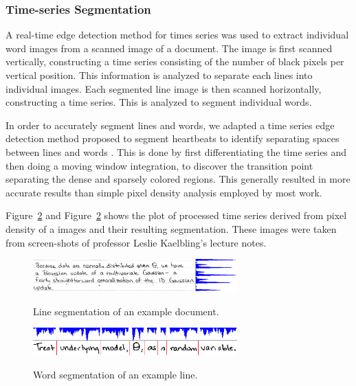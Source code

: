 \documentclass[12pt]{article}
\begin{document}
		\subsubsection{Time-series Segmentation}
		A real-time edge detection method for times series was used to extract individual word images from a scanned image of a document. The image is first scanned vertically, constructing a time series consisting of the number of black pixels per vertical position. This information is analyzed to separate each lines into individual images. Each segmented line image is then scanned horizontally, constructing a time series. This is analyzed to segment individual words.
		
		In order to accurately segment lines and words, we adapted a time series edge detection method proposed to segment heartbeats to identify separating spaces between lines and words \cite{QRS}. This is done by first differentiating the time series and then doing a moving window integration, to discover the transition point separating the dense and sparsely colored regions. This generally resulted in more accurate results than simple pixel density analysis employed by most work.
		
		Figure~\ref{figure:word_segmentation} and Figure~\ref{figure:word_segmentation} shows the plot of processed time series derived from pixel density of a images and their resulting segmentation. These images were taken from screen-shots of professor Leslie Kaelbling's lecture notes.


		\begin{figure}[htbp!]
		\centering
		\includegraphics[width=0.7\textwidth]{line_segmentation.eps}
		\label{figure:line_segmentation}
		\caption{Line segmentation of an example document.}
		\end{figure}
		
		\begin{figure}[htbp!]
		\centering
		\includegraphics[width=0.7\textwidth]{word_segmentation.eps}
		\label{figure:word_segmentation}
		\caption{Word segmentation of an example line.}
		\end{figure}
\end{document}
